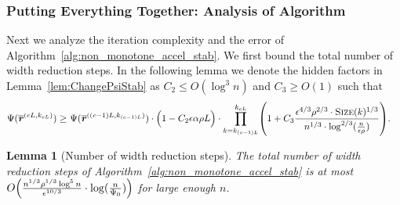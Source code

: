 \documentclass[11pt]{article}
\newtheorem{lemma}[theorem]{Lemma}
\let\originalleft\left
\let\originalright\right
\renewcommand{\left}{\mathopen{}\mathclose\bgroup\originalleft}
\renewcommand{\right}{\aftergroup\egroup\originalright}
\newcommand\rr{\boldsymbol{\mathit{r}}}
\newcommand{\ov}{\overline}
\begin{document}
\subsubsection{Putting Everything Together: Analysis of Algorithm}
Next we analyze the iteration complexity and the error of Algorithm~\ref{alg:non_monotone_accel_stab}. We first bound the total number of width reduction steps. In the following lemma we denote the hidden factors in Lemma~\ref{lem:ChangePsiStab} as $C_2 \leq O(\log^3 n)$ and $C_3 \geq O(1)$ such that
\begin{align*}
\Psi(\ov{\rr}^{(cL,k_{cL})}) 
\geq &~ \Psi(\ov{\rr}^{((c-1)L,k_{(c-1)L})}) \cdot \Big(1 -  C_2 \epsilon \alpha \rho L \Big) \cdot \prod_{k=k_{(c-1)L}}^{k_{cL}} \left( 1 + C_3 \frac{\epsilon^{4/3} \rho^{2/3} \cdot \textsc{Size}(k)^{1/3}}{n^{1/3} \cdot \log^{2/3}(\frac{n}{\epsilon \rho})} \right).
\end{align*}
\begin{lemma}[Number of width reduction steps]\label{lem:number_of_width_reduction_steps}
The total number of width reduction steps of Algorithm~\ref{alg:non_monotone_accel_stab} is at most $O\left(\frac{n^{1/3} \rho^{1/3} \log^5 n}{\epsilon^{10/3}} \cdot \log(\frac{n}{\Psi_0}) \right)$ for large enough $n$. 
\end{lemma}
\end{document}
